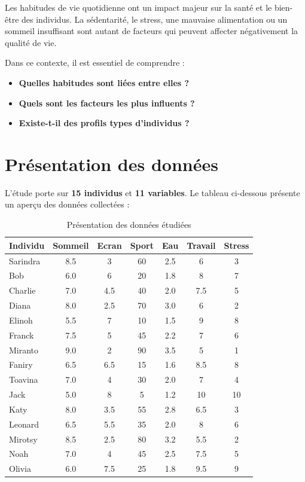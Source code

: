 \documentclass[12pt,a4paper]{book}
\begin{document}
	Les habitudes de vie quotidienne ont un impact majeur sur la santé et le bien-être des individus. La sédentarité, le stress, une mauvaise alimentation ou un sommeil insuffisant sont autant de facteurs qui peuvent affecter négativement la qualité de vie.
	
	\vspace{0.5cm}
	
	Dans ce contexte, il est essentiel de comprendre :
	\begin{itemize}
		\item \textbf{Quelles habitudes sont liées entre elles ?}
		\item \textbf{Quels sont les facteurs les plus influents ?}
		\item \textbf{Existe-t-il des profils types d'individus ?}
	\end{itemize}
	
	\section{Présentation des données}
	
	L'étude porte sur \textbf{15 individus} et \textbf{11 variables}. Le tableau ci-dessous présente un aperçu des données collectées :
	
	\vspace{0.5cm}
	
	\begin{table}[H]
		\centering
		\caption{Présentation des données étudiées}
		\begin{tabular}{lcccccc}
			\toprule
			\textbf{Individu} & \textbf{Sommeil} & \textbf{Ecran} & \textbf{Sport} & \textbf{Eau} & \textbf{Travail} & \textbf{Stress} \\
			\midrule
			Sarindra & 8.5 & 3 & 60 & 2.5 & 6 & 3 \\
			Bob & 6.0 & 6 & 20 & 1.8 & 8 & 7 \\
			Charlie & 7.0 & 4.5 & 40 & 2.0 & 7.5 & 5 \\
			Diana & 8.0 & 2.5 & 70 & 3.0 & 6 & 2 \\
			Elinoh & 5.5 & 7 & 10 & 1.5 & 9 & 8 \\
			Franck & 7.5 & 5 & 45 & 2.2 & 7 & 6 \\
			Miranto & 9.0 & 2 & 90 & 3.5 & 5 & 1 \\
			Faniry & 6.5 & 6.5 & 15 & 1.6 & 8.5 & 8 \\
			Toavina & 7.0 & 4 & 30 & 2.0 & 7 & 4 \\
			Jack & 5.0 & 8 & 5 & 1.2 & 10 & 10 \\
			Katy & 8.0 & 3.5 & 55 & 2.8 & 6.5 & 3 \\
			Leonard & 6.5 & 5.5 & 35 & 2.0 & 8 & 6 \\
			Mirotsy & 8.5 & 2.5 & 80 & 3.2 & 5.5 & 2 \\
			Noah & 7.0 & 4 & 45 & 2.5 & 7.5 & 5 \\
			Olivia & 6.0 & 7.5 & 25 & 1.8 & 9.5 & 9 \\
			\bottomrule
		\end{tabular}
	\end{table}
	
\end{document}
